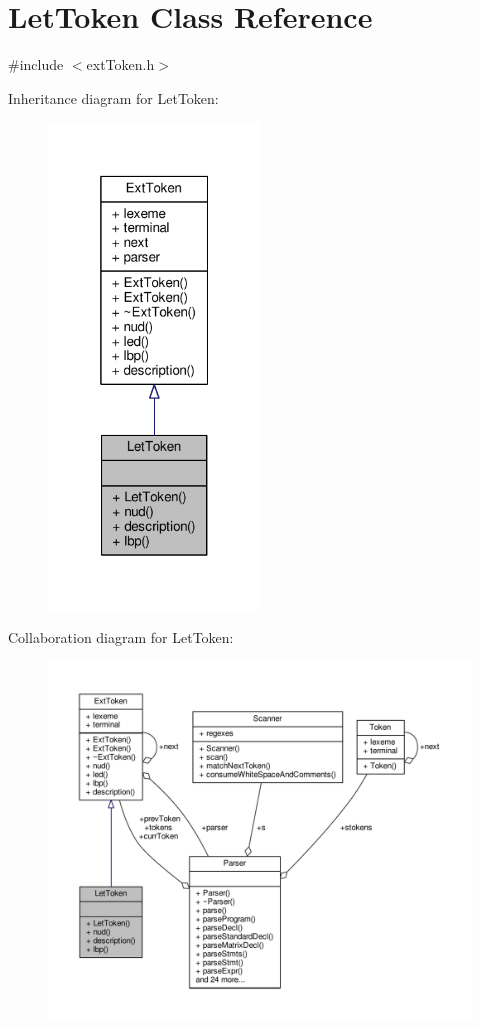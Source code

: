 \hypertarget{classLetToken}{\section{Let\-Token Class Reference}
\label{classLetToken}
}


{\ttfamily \#include $<$ext\-Token.\-h$>$}



Inheritance diagram for Let\-Token\-:\nopagebreak
\begin{figure}[H]
\begin{center}
\leavevmode
\includegraphics[width=160pt]{classLetToken__inherit__graph}
\end{center}
\end{figure}


Collaboration diagram for Let\-Token\-:\nopagebreak
\begin{figure}[H]
\begin{center}
\leavevmode
\includegraphics[width=350pt]{classLetToken__coll__graph}
\end{center}
\end{figure}
